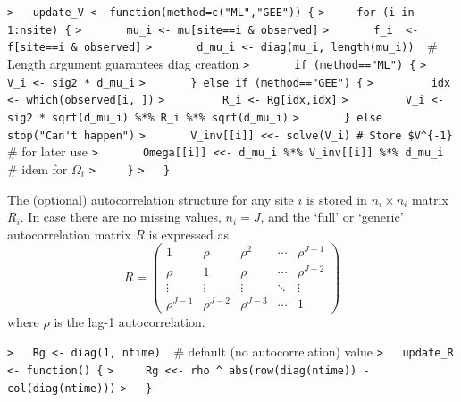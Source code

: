 \documentclass[a4paper]{article}
\begin{document}
\verb~>   update_V <- function(method=c("ML","GEE")) {~\newline
\verb~>     for (i in 1:nsite) {~\newline
\verb~>       mu_i <- mu[site==i & observed]~\newline
\verb~>       f_i  <- f[site==i & observed]~\newline
\verb~>       d_mu_i <- diag(mu_i, length(mu_i))  ~{\sffamily\# Length argument guarantees diag creation}\newline
\verb~>       if (method=="ML") {~\newline
\verb~>         V_i <- sig2 * d_mu_i~\newline
\verb~>       } else if (method=="GEE") {~\newline
\verb~>         idx <- which(observed[i, ])~\newline
\verb~>         R_i <- Rg[idx,idx]~\newline
\verb~>         V_i <- sig2 * sqrt(d_mu_i) %*% R_i %*% sqrt(d_mu_i)~\newline
\verb~>       } else stop("Can't happen")~\newline
\verb~>       V_inv[[i]] <<- solve(V_i) # Store $V^{-1}  ~{\sffamily\# for later use}\newline
\verb~>       Omega[[i]] <<- d_mu_i %*% V_inv[[i]] %*% d_mu_i  ~{\sffamily\# idem for $\Omega_i$}\newline
\verb~>     }~\newline
\verb~>   }~\par

The (optional) autocorrelation structure for any site $i$ is stored in $n_i\times n_i$ matrix $R_i$.
In case there are no missing values, $n_i=J$, and the `full' or `generic' autocorrelation matrix $R$ is expressed
as
\begin{equation}
R = \begin{pmatrix}
  1          & \rho       & \rho^2     & \cdots & \rho^{J-1} \\
  \rho       & 1          & \rho       & \cdots & \rho^{J-2} \\
  \vdots     & \vdots     & \vdots     & \ddots & \vdots     \\
  \rho^{J-1} & \rho^{J-2} & \rho^{J-3} & \cdots & 1
  \end{pmatrix}
\end{equation}
where $\rho$ is the lag-1 autocorrelation.\par
\verb~>   Rg <- diag(1, ntime)  ~{\sffamily\# default (no autocorrelation) value}\newline
\verb~>   update_R <- function() {~\newline
\verb~>     Rg <<- rho ^ abs(row(diag(ntime)) - col(diag(ntime)))~\newline
\verb~>   }~\par
\end{document}
